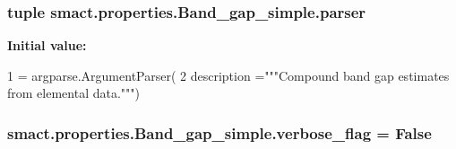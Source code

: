 \subsubsection[{parser}]{\setlength{\rightskip}{0pt plus 5cm}tuple smact.\+properties.\+Band\+\_\+gap\+\_\+simple.\+parser}\label{namespacesmact_1_1properties_1_1_band__gap__simple_abe4d22f74e3d7975f257f0189add69b8}
{\bfseries Initial value\+:}
\begin{DoxyCode}
1 = argparse.ArgumentParser(
2         description =\textcolor{stringliteral}{"""Compound band gap estimates from elemental data."""})
\end{DoxyCode}
\hypertarget{namespacesmact_1_1properties_1_1_band__gap__simple_a25cb7d2a569d44a7a849af519c43e115}{}
\subsubsection[{verbose\+\_\+flag}]{\setlength{\rightskip}{0pt plus 5cm}smact.\+properties.\+Band\+\_\+gap\+\_\+simple.\+verbose\+\_\+flag = False}\label{namespacesmact_1_1properties_1_1_band__gap__simple_a25cb7d2a569d44a7a849af519c43e115}

